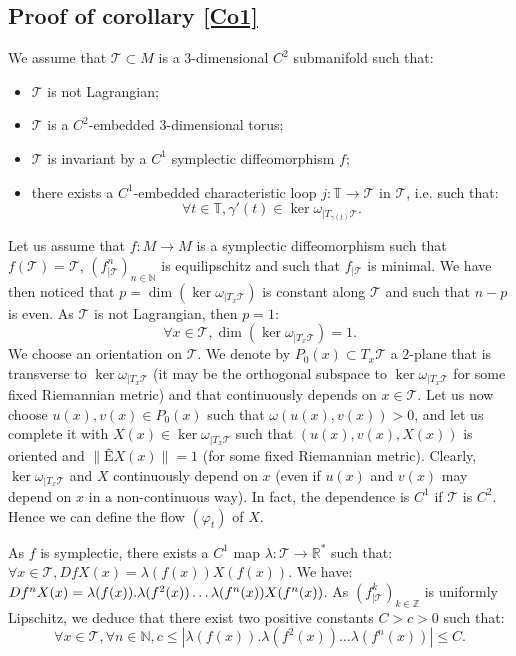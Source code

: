 \documentclass{dcds}
\theoremstyle{definition}
\begin{document}
 \subsection{Proof of corollary \ref{Co1}}

We assume   that ${\mathcal {T}}\subset M$ is a $3$-dimensional $C^2$ submanifold such that:
\begin{itemize}
\item ${\mathcal {T}}$ is not Lagrangian;
\item ${\mathcal {T}}$ is a  $C^2$-embedded $3$-dimensional torus;
\item ${\mathcal {T}}$ is invariant by a $C^1$ symplectic diffeomorphism $f$;
\item   there exists a $C^1$-embedded characteristic loop $j:{\mathbb {T}} \rightarrow {\mathcal {T}}$ in ${\mathcal {T}}$, i.e.  such that:
$$\forall t \in{\mathbb {T}} , \gamma'(t)\in\ker\omega_{|T_{\gamma(t)}{\mathcal {T}}}.$$
\end{itemize}
Let us assume that $f:M\rightarrow M$ is a symplectic diffeomorphism such that $f({\mathcal {T}})={\mathcal {T}}$, $(f^n_{|{\mathcal {T}}})_{n\in{\mathbb {N}}}$ is equilipschitz  and such that $f_{|{\mathcal {T}}}$ is minimal. We have then noticed that $p=\dim(\ker \omega_{|T_x{\mathcal {T}}})$ is constant along ${\mathcal {T}}$ and such that $n-p$ is even. As ${\mathcal {T}}$ is not Lagrangian, then $p=1$:
$$\forall x\in{\mathcal {T}}, \dim\left( \ker\omega_{|T_{x}{\mathcal {T}}}\right)=1.$$
We choose an orientation on ${\mathcal {T}}$. We denote by $P_0(x)\subset T_x{\mathcal {T}}$ a $2$-plane that is transverse to $\ker\omega_{|T_x{\mathcal {T}}}$ (it may be the orthogonal subspace to $\ker\omega_{|T_x{\mathcal {T}}}$ for some fixed Riemannian metric) and that continuously depends on $x\in{\mathcal {T}}$. Let us now choose $u(x), v(x)\in P_0(x)$ such that $\omega (u(x), v(x))>0$, and let us complete it with $X(x)\in \ker\omega_{|T_x{\mathcal {T}}}$ such that $(u(x), v(x), X(x))$ is oriented and $\|ÊX(x)\|=1$ (for some fixed Riemannian metric). Clearly,     $\ker\omega_{|T_x{\mathcal {T}}}$ and $X$ continuously depend on $x$ (even if $u(x)$ and $v(x)$ may depend on $x$ in a non-continuous way). In fact, the dependence is $C^1$ if ${\mathcal {T}}$ is $C^2$.  Hence we can define the flow $(\varphi_t)$ of $X$.  

As $f$ is symplectic, there exists a $C^1$ map $\lambda:{\mathcal {T}}\rightarrow {\mathbb {R}}^*$ such that: $\forall x\in {\mathcal {T}}, DfX(x)=\lambda (f(x))X(f(x))$.
We have: $Df^nX(x)=\lambda (f(x)).\lambda(f^2(x))\dots\break \lambda (f^n(x))X(f^n(x))$. As $(f_{|{\mathcal {T}}}^k)_{k\in{\mathbb {Z}}}$ is uniformly Lipschitz, we deduce that there exist two positive constants $C>c>0$ such that:
$$\forall x\in{\mathcal {T}}, \forall n\in{\mathbb {N}}, c\leq |\lambda (f(x)).\lambda(f^2(x))\dots \lambda (f^n(x))|\leq C.$$
\end{document}
